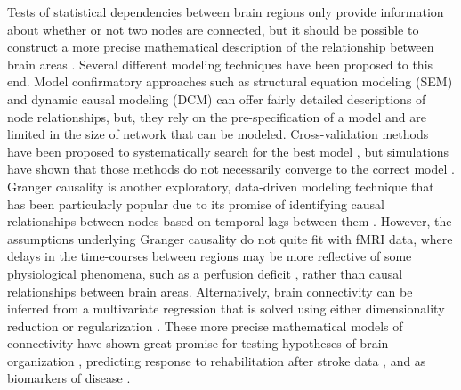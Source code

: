 \documentclass{bmcart}
\begin{document}
Tests of statistical dependencies between brain regions only provide information about whether or not two nodes are connected, but it should be possible to construct a more precise mathematical description of the relationship between brain areas \cite{Friston1994}. Several different modeling techniques have been proposed to this end. Model confirmatory approaches such as structural equation modeling (SEM) \cite{Buchel1997} and dynamic causal modeling (DCM) \cite{Friston2003} can offer fairly detailed descriptions of node relationships, but, they rely on the pre-specification of a model and are limited in the size of network that can be modeled. Cross-validation methods have been proposed to systematically search for the best model \cite{Zhuang2005,Penny2010,James2009}, but simulations have shown that those methods do not necessarily converge to the correct model \cite{Lohmann2012}. Granger causality is another exploratory, data-driven modeling technique that has been particularly popular due to its promise of identifying causal relationships between nodes based on temporal lags between them \cite{Deshpande2011}. However, the assumptions underlying Granger causality do not quite fit with fMRI data\cite{Smith2011}, where delays in the time-courses between regions may be more reflective of some physiological phenomena, such as a perfusion deficit \cite{Lv2013}, rather than causal relationships between brain areas. Alternatively, brain connectivity can be inferred from a multivariate regression  that is solved using either dimensionality reduction \cite{Friston1994} or regularization \cite{Craddock2013b}. These more precise mathematical models of connectivity have shown great promise for testing hypotheses of brain organization \cite{Craddock2013b}, predicting response to rehabilitation after stroke data \cite{James2009b}, and as biomarkers of disease \cite{Brodersen2011}.
\end{document}
